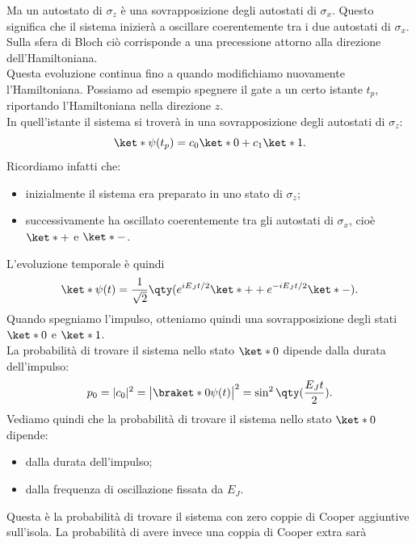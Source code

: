 Ma un autostato di $\sigma_z$ è una sovrapposizione degli autostati di $\sigma_x$. Questo significa che il sistema inizierà a oscillare coerentemente tra i due autostati di $\sigma_x$.\\
Sulla sfera di Bloch ciò corrisponde a una precessione attorno alla direzione dell'Hamiltoniana.\\
Questa evoluzione continua fino a quando modifichiamo nuovamente l'Hamiltoniana. Possiamo ad esempio spegnere il gate a un certo istante $t_p$, riportando l'Hamiltoniana nella direzione $z$.\\
In quell'istante il sistema si troverà in una sovrapposizione degli autostati di $\sigma_z$:
\begin{equation*}
    \ket*{\psi(t_p)}
    =
    c_0 \ket*{0}
    +
    c_1 \ket*{1}.
\end{equation*}
Ricordiamo infatti che:
\begin{itemize}[leftmargin=0.5cm]
    \item inizialmente il sistema era preparato in uno stato di $\sigma_z$;
    \item successivamente ha oscillato coerentemente tra gli autostati di $\sigma_x$, cioè $\ket*{+}$ e $\ket*{-}$.
\end{itemize}
L'evoluzione temporale è quindi
\begin{equation*}
    \ket*{\psi(t)}
    =
    \frac{1}{\sqrt{2}}
    \qty(
        e^{iE_J t/2}\ket*{+}
        +
        e^{-iE_J t/2}\ket*{-}
    ).
\end{equation*}
Quando spegniamo l'impulso, otteniamo quindi una sovrapposizione degli stati $\ket*{0}$ e $\ket*{1}$.\\
La probabilità di trovare il sistema nello stato $\ket*{0}$ dipende dalla durata dell'impulso:
\begin{equation*}
    p_0
    =
    |c_0|^2
    =
    \bigl|
        \braket*{0}{\psi(t)}
    \bigr|^2
    =
    \sin^2{
        \qty(
            \frac{E_J t}{2}
        )
    }.
\end{equation*}
Vediamo quindi che la probabilità di trovare il sistema nello stato $\ket*{0}$ dipende:
\begin{itemize}[leftmargin=0.5cm]
    \item dalla durata dell'impulso;
    \item dalla frequenza di oscillazione fissata da $E_J$.
\end{itemize}
Questa è la probabilità di trovare il sistema con zero coppie di Cooper aggiuntive sull'isola. La probabilità di avere invece una coppia di Cooper extra sarà
